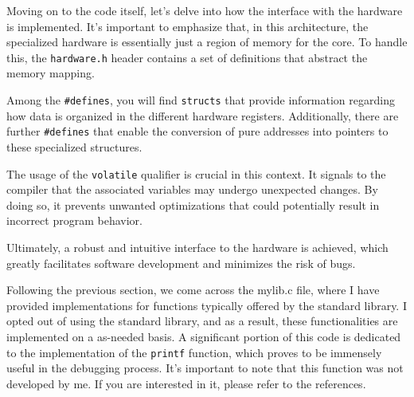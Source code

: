 \documentclass[12pt,a4paper]{article}
\begin{document}
Moving on to the code itself, let's delve into how the interface with the
hardware is implemented. It's important to emphasize that, in this
architecture, the specialized hardware is essentially just a region of memory
for the core. To handle this, the \texttt{hardware.h} header contains a set of 
definitions that abstract the memory mapping.

Among the \texttt{\#defines}, you will find \texttt{structs} that provide
information regarding how data is organized in the different hardware registers.
Additionally, there are further \texttt{\#defines} that enable the conversion
of pure addresses into pointers to these specialized
structures.

The usage of the \texttt{volatile} qualifier is crucial in this context. It
signals to the compiler that the associated variables may undergo unexpected
changes. By doing so, it prevents unwanted optimizations that could potentially
result in incorrect program behavior.

Ultimately, a robust and intuitive interface to the hardware is achieved,
which greatly facilitates software development and minimizes the risk of bugs.

Following the previous section, we come across the mylib.c file, where I have
provided implementations for functions typically offered by the standard
library. I opted out of using the standard library, and as a result, these
functionalities are implemented on a as-needed basis. A significant portion of
this code is dedicated to the implementation of the \texttt{printf} function,
which proves to be immensely useful in the debugging process. It's important
to note that this function was not developed by me. If you are interested in it,
please refer to the references.
\end{document}
